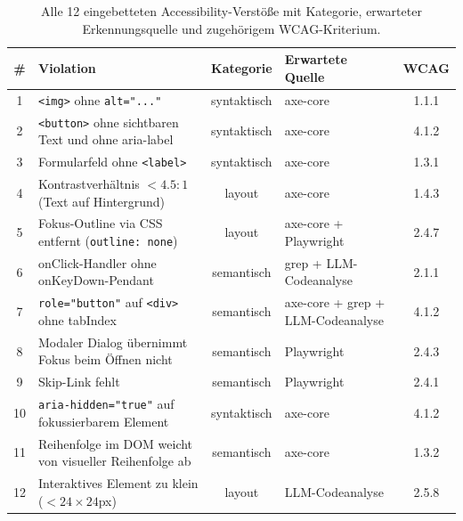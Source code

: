 \clearpage



\label{app:accessibility_verstoesse_12}\label{app:block_test12}

\begin{table}[htbp]
\centering
\setlength{\tabcolsep}{3.5pt}
\renewcommand{\arraystretch}{1.2}
\caption[Accessibility-Verstöße (test-12)]{Alle 12 eingebetteten Accessibility-Verstöße mit Kategorie, erwarteter Erkennungsquelle und zugehörigem \ac{WCAG}-Kriterium.}
\begin{tabular}{|c|p{5.8cm}|c|p{4.2cm}|c|}
\hline
\textbf{\#} & \textbf{Violation} & \textbf{Kategorie} & \textbf{Erwartete Quelle} & \textbf{\ac{WCAG}} \\
\hline
1 & \texttt{<img>} ohne \texttt{alt="..."} & syntaktisch & axe-core & 1.1.1 \\
\hline
2 & \texttt{<button>} ohne sichtbaren Text und ohne aria-label & syntaktisch & axe-core & 4.1.2 \\
\hline
3 & Formularfeld ohne \texttt{<label>} & syntaktisch & axe-core & 1.3.1 \\
\hline
4 & Kontrastverhältnis $< 4.5:1$ (Text auf Hintergrund) & layout & axe-core & 1.4.3 \\
\hline
5 & Fokus-Outline via \ac{CSS} entfernt (\texttt{outline: none}) & layout & axe-core + Playwright & 2.4.7 \\
\hline
6 & onClick-Handler ohne onKeyDown-Pendant & semantisch & grep + \ac{LLM}-Codeanalyse & 2.1.1 \\
\hline
7 & \texttt{role="button"} auf \texttt{<div>} ohne tabIndex & semantisch & axe-core + grep + \ac{LLM}-Codeanalyse & 4.1.2 \\
\hline
8 & Modaler Dialog übernimmt Fokus beim Öffnen nicht & semantisch & Playwright & 2.4.3 \\
\hline
9 & Skip-Link fehlt & semantisch & Playwright & 2.4.1 \\
\hline
10 & \texttt{aria-hidden="true"} auf fokussierbarem Element & syntaktisch & axe-core & 4.1.2 \\
\hline
11 & Reihenfolge im \ac{DOM} weicht von visueller Reihenfolge ab & semantisch & axe-core & 1.3.2 \\
\hline
12 & Interaktives Element zu klein ($<24\times24$px) & layout & \ac{LLM}-Codeanalyse & 2.5.8 \\
\hline
\end{tabular}
\label{tab:accessibility_verstoesse}
\end{table}

